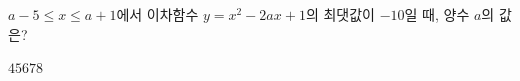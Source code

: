 $a-5\le x\le a+1$에서 이차함수 $y=x^2-2ax+1$의 최댓값이 $-10$일 때, 양수 $a$의 값은?
\begin{choices32}{$4$}{$5$}{$6$}{$7$}{$8$}\end{choices32}
